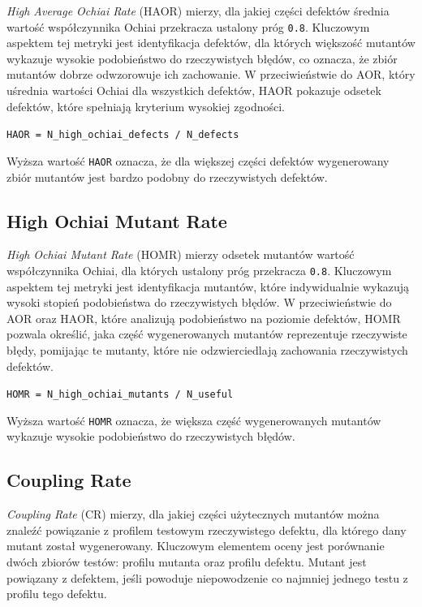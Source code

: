 \documentclass[12pt,a4paper,oldfontcommands]{memoir}
\theoremstyle{plain}
\theoremstyle{definition}
\theoremstyle{remark}
\begin{document}
    \textit{High Average Ochiai Rate} (HAOR) mierzy, dla jakiej części defektów średnia wartość współczynnika Ochiai przekracza ustalony próg \texttt{0.8}.
    Kluczowym aspektem tej metryki jest identyfikacja defektów, dla których większość mutantów wykazuje wysokie podobieństwo do rzeczywistych błędów, co oznacza, że zbiór mutantów dobrze odwzorowuje ich zachowanie.
    W przeciwieństwie do AOR, który uśrednia wartości Ochiai dla wszystkich defektów, HAOR pokazuje odsetek defektów, które spełniają kryterium wysokiej zgodności.

    \begin{center}
        \texttt{HAOR = N\_high\_ochiai\_defects / N\_defects}
    \end{center}

    Wyższa wartość \texttt{HAOR} oznacza, że dla większej części defektów wygenerowany zbiór mutantów jest bardzo podobny do rzeczywistych defektów.

    \subsection{High Ochiai Mutant Rate}

    \textit{High Ochiai Mutant Rate} (HOMR) mierzy odsetek mutantów wartość współczynnika Ochiai, dla których ustalony próg przekracza \texttt{0.8}.
    Kluczowym aspektem tej metryki jest identyfikacja mutantów, które indywidualnie wykazują wysoki stopień podobieństwa do rzeczywistych błędów.
    W przeciwieństwie do AOR oraz HAOR, które analizują podobieństwo na poziomie defektów, HOMR pozwala określić, jaka część wygenerowanych mutantów reprezentuje rzeczywiste błędy, pomijając te mutanty, które nie odzwierciedlają zachowania rzeczywistych defektów.

    \begin{center}
        \texttt{HOMR = N\_high\_ochiai\_mutants / N\_useful}
    \end{center}

    Wyższa wartość \texttt{HOMR} oznacza, że większa część wygenerowanych mutantów wykazuje wysokie podobieństwo do rzeczywistych błędów.

    \subsection{Coupling Rate}

    \textit{Coupling Rate} (CR) mierzy, dla jakiej części użytecznych mutantów można znaleźć powiązanie z profilem testowym rzeczywistego defektu, dla którego dany mutant został wygenerowany.
    Kluczowym elementem oceny jest porównanie dwóch zbiorów testów: profilu mutanta oraz profilu defektu.
    Mutant jest powiązany z defektem, jeśli powoduje niepowodzenie co najmniej jednego testu z profilu tego defektu.
\end{document}

